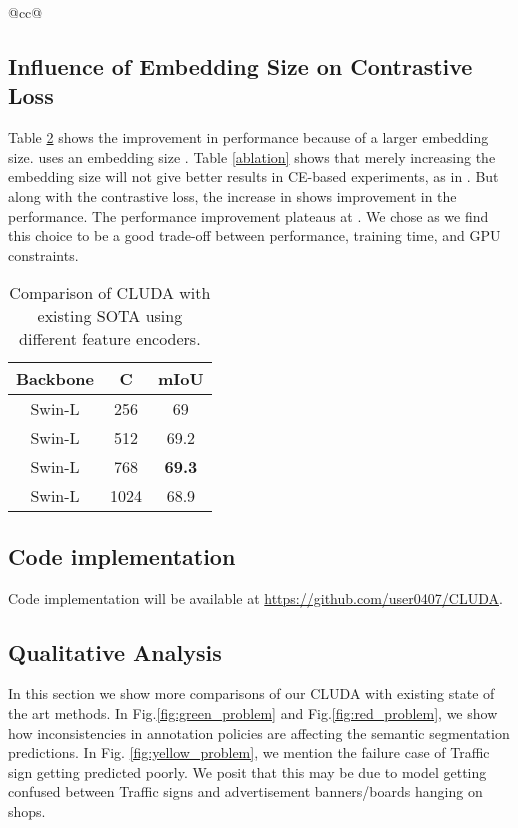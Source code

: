\documentclass{article}
\begin{document}
\begin{table}[h]
{\begin{tabular}{@{}cc@{}}
\subsection{Influence of Embedding Size on Contrastive Loss} \label{sec:embed_size_sec}
Table \ref{tab:compare_embed} shows the improvement in performance because of a larger embedding size. \cite{hoyer2021daformer, hoyer2022hrda} uses an embedding size . Table \ref{ablation} shows that merely increasing the embedding size will not give better results in CE-based experiments, as in  \cite{hoyer2021daformer}. But along with the contrastive loss, the increase in  shows improvement in the performance. The performance improvement plateaus at . We chose  as we find this choice to be a good trade-off between performance, training time, and GPU constraints.

\begin{table}[]
    \scriptsize
    \centering
    \begin{tabular}{@{}ccc@{}}
            \toprule
            Backbone & C    & mIoU \\ \midrule
            Swin-L\cite{liu2021swin}   & 256  & 69   \\
            Swin-L\cite{liu2021swin}   & 512  & 69.2 \\
            Swin-L\cite{liu2021swin}   & 768  & \textbf{69.3} \\
            Swin-L\cite{liu2021swin}   & 1024 & 68.9 \\ \bottomrule
            \end{tabular}
    \vspace{1em}
    \caption{Comparison of CLUDA with existing SOTA using different feature encoders.}
    \label{tab:compare_embed}
\end{table}

\subsection{Code implementation}\label{sec:code_impl}
Code implementation will be available at \url{https://github.com/user0407/CLUDA}.


\subsection{Qualitative Analysis}\label{qualitative_analysis}
In this section we show more comparisons of our CLUDA with existing state of the art methods. In Fig.\ref{fig:green_problem} and Fig.\ref{fig:red_problem}, we show how inconsistencies in annotation policies are affecting the semantic segmentation predictions. In Fig. \ref{fig:yellow_problem}, we mention the failure case of Traffic sign getting predicted poorly. We posit that this may be due to model getting confused between Traffic signs and advertisement banners/boards hanging on shops.


\end{tabular}}
\end{table}
\end{document}
